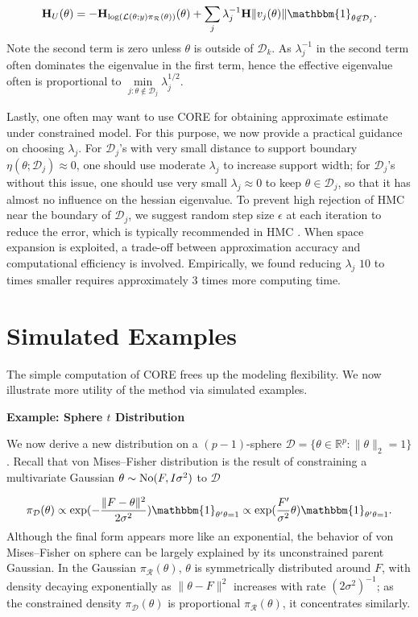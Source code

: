 \documentclass[10pt,fleqn]{article} \pdfoutput=1
\newcommand{\bb}[1]{\mathbb{#1}} \newcommand{\mc}[1]{\mathcal{#1}}
\DeclareMathOperator{\1}{\mathbbm{1}} \DeclareMathOperator{\bigO}{\mc O}
\newcommand{\hess}{\mathbf{H}} %
\begin{document}
\begin{equation} \label{eq:hessian_extrinsic}
 \hess_U(\theta) = -\hess_{\log
		(\mathcal L(\theta;y) \pi_{\mc R}(\theta))
	}(\theta)+\sum_j \lambda_j^{-1} \hess {\|v_j(\theta)\|}
	\mathbbm{1}_{\theta\not\in \mc D_j}. \end{equation}
Note the second term is zero unless $\theta$ is outside of $\mc D_k$. As $\lambda^{-1}_j$ in the
second term often dominates the eigenvalue in the first term, hence the effective eigenvalue often is
proportional to $ \underset{j: \theta \not\in \mc D_j}{\min}\lambda_j^{1/2}$.

Lastly, one often may want to use CORE for obtaining approximate estimate under constrained model.
For this purpose, we now provide a practical guidance on choosing $\lambda_j$.  For $\mc
D_j$'s with very small distance to support boundary $\eta(\theta;\mc D_j)\approx 0$, one should use moderate $\lambda_j$
to increase support width;  for $\mc D_j$'s
without this issue, one should use very small $\lambda_j\approx 0$ to keep $\theta\in\mc D_j$, so that it has almost no influence on the hessian eigenvalue. 
To prevent high rejection of HMC near the boundary of $\mc D_j$, we suggest random step size $\epsilon$ at each iteration to
reduce the error, which is typically recommended in HMC \citep{neal2011mcmc}. When space expansion is exploited, a trade-off between approximation accuracy
and computational efficiency is involved. Empirically, we found reducing
$\lambda_{j}$ $10$ to times smaller requires approximately $3$ times more
computing time.


\section{Simulated Examples}

The simple computation of CORE frees up the modeling flexibility. We now illustrate more utility of the method via simulated examples.

\textbf{Example: Sphere $t$ Distribution}

We now derive a new distribution on a $(p-1)$-sphere $\mc
D=\{\theta\in
\bb R^p:\|\theta\|_2 =1\}$. Recall that von
Mises--Fisher distribution \citep{khatri1977mises} is the result of constraining a multivariate Gaussian $\theta \sim \operatorname{No}(F,I\sigma^2)$ to $\mc D$

$$
\pi_{\mc D}(\theta) \propto
\exp(-\frac{\|F-\theta\|^2}{2\sigma^2})
\mathbbm{1}_{\theta'\theta=1} \\
 \propto
\exp(\frac{F'}{\sigma^2}\theta)
\mathbbm{1}_{\theta'\theta=1}.
$$
 Although the final form
appears more
like an exponential, the behavior of von
Mises--Fisher
on sphere can be largely explained by its unconstrained parent Gaussian.
In the Gaussian $\pi_{\mc
R}(\theta)$, $\theta$ is symmetrically distributed around $F$, with density
decaying exponentially as $\| \theta-F\|^2$ increases with rate 
$({2\sigma^2})^{-1}$; as the constrained
density $\pi_{\mc D}(\theta)$ is proportional $\pi_{\mc R}(\theta)$, it concentrates
similarly. 
\end{document}
